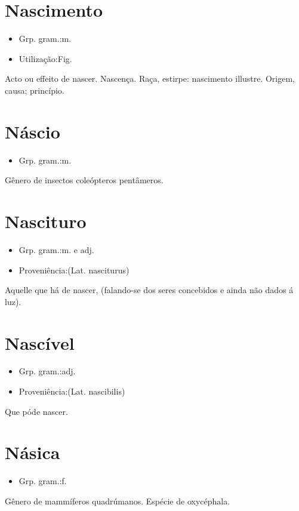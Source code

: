 \section{Nascimento}
\begin{itemize}
\item {Grp. gram.:m.}
\end{itemize}
\begin{itemize}
\item {Utilização:Fig.}
\end{itemize}
Acto ou effeito de nascer.
Nascença.
Raça, estirpe: \textunderscore nascimento illustre\textunderscore .
Origem, causa; princípio.
\section{Náscio}
\begin{itemize}
\item {Grp. gram.:m.}
\end{itemize}
Gênero de insectos coleópteros pentâmeros.
\section{Nascituro}
\begin{itemize}
\item {Grp. gram.:m.  e  adj.}
\end{itemize}
\begin{itemize}
\item {Proveniência:(Lat. \textunderscore nasciturus\textunderscore )}
\end{itemize}
Aquelle que há de nascer, (falando-se dos seres concebidos e ainda não dados á luz).
\section{Nascível}
\begin{itemize}
\item {Grp. gram.:adj.}
\end{itemize}
\begin{itemize}
\item {Proveniência:(Lat. \textunderscore nascibilis\textunderscore )}
\end{itemize}
Que póde nascer.
\section{Násica}
\begin{itemize}
\item {Grp. gram.:f.}
\end{itemize}
Gênero de mammíferos quadrúmanos.
Espécie de oxycéphala.
